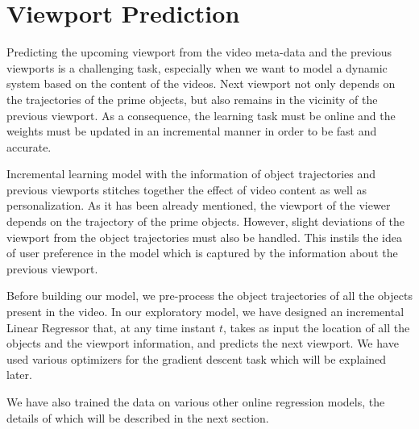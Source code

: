 \section{Viewport Prediction}
\par
Predicting the upcoming viewport from the video meta-data and the previous viewports is a challenging task, especially when we want to model a dynamic system based on the content of the videos. Next viewport not only depends on the trajectories of the prime objects, but also remains in the vicinity of the previous viewport. As a consequence, the learning task must be online and the weights must be updated in an incremental manner in order to be fast and accurate.
\par
Incremental learning model with the information of object trajectories and previous viewports stitches together the effect of video content as well as personalization. As it has been already mentioned, the viewport of the viewer depends on the trajectory of the prime objects. However, slight deviations of the viewport from the object trajectories must also be handled. This instils the idea of user preference in the model which is captured by the information about the previous viewport.
\par
Before building our model, we pre-process the object trajectories of all the objects present in the video. In our exploratory model, we have designed an incremental Linear Regressor that, at any time instant $t$, takes as input the location of all the objects and the viewport information, and predicts the next viewport. We have used various optimizers for the gradient descent task which will be explained later.
\par
We have also trained the data on various other online regression models, the details of which will be described in the next section. 
